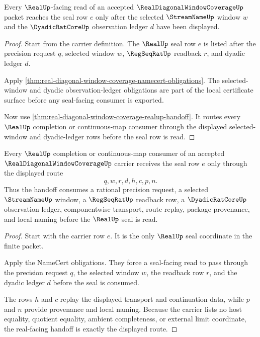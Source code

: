 \begin{theorem}
\label{thm:real-diagonal-window-coverage-selected-window-coverage}
Every $\RealUp$-facing read of an accepted $\RealDiagonalWindowCoverageUp$ packet reaches the seal row $e$ only after the selected $\StreamNameUp$ window $w$ and the $\DyadicRatCoreUp$ observation ledger $d$ have been displayed.
\end{theorem}
\begin{proof}
Start from the carrier definition. The $\RealUp$ seal row $e$ is listed after the precision request $q$, selected window $w$, $\RegSeqRatUp$ readback $r$, and dyadic ledger $d$.

Apply \autoref{thm:real-diagonal-window-coverage-namecert-obligations}. The selected-window and dyadic observation-ledger obligations are part of the local certificate surface before any seal-facing consumer is exported.

Now use \autoref{thm:real-diagonal-window-coverage-realup-handoff}. It routes every $\RealUp$ completion or continuous-map consumer through the displayed selected-window and dyadic-ledger rows before the seal row is read.
\end{proof}

\begin{theorem}
\label{thm:real-diagonal-window-coverage-realup-handoff}
Every $\RealUp$ completion or continuous-map consumer of an accepted $\RealDiagonalWindowCoverageUp$ carrier receives the seal row $e$ only through the displayed route
$$
q,w,r,d,h,c,p,n.
$$
Thus the handoff consumes a rational precision request, a selected $\StreamNameUp$ window, a $\RegSeqRatUp$ readback row, a $\DyadicRatCoreUp$ observation ledger, componentwise transport, route replay, package provenance, and local naming before the $\RealUp$ seal is read.
\end{theorem}
\begin{proof}
Start with the carrier row $e$. It is the only $\RealUp$ seal coordinate in the finite packet.

Apply the NameCert obligations. They force a seal-facing read to pass through the precision request $q$, the selected window $w$, the readback row $r$, and the dyadic ledger $d$ before the seal is consumed.

The rows $h$ and $c$ replay the displayed transport and continuation data, while $p$ and $n$ provide provenance and local naming. Because the carrier lists no host equality, quotient equality, ambient completeness, or external limit coordinate, the real-facing handoff is exactly the displayed route.
\end{proof}

